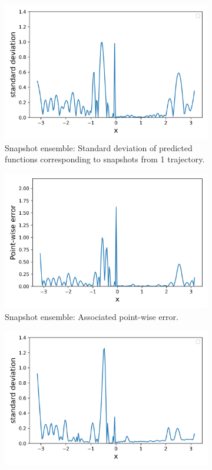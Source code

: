 \begin{figure}[H]
\begin{subfigure}[b]{.45\textwidth}
		\includegraphics[width=1\linewidth]{./figs/snap_rep_std.png}  
		\caption{Snapshot ensemble: Standard deviation of predicted functions corresponding to snapshots from 1 trajectory.}
	\end{subfigure}
	\begin{subfigure}[b]{.45\textwidth}
		\centering
		\includegraphics[width=1\linewidth]{./figs/snap_rep_err.png}  
		\caption{Snapshot ensemble: Associated point-wise error. \newline}
	\end{subfigure}
	\begin{subfigure}[b]{.45\textwidth}
		\centering
		\includegraphics[width=1\linewidth]{./figs/ens_std.png}  

\end{subfigure}
\end{figure}
